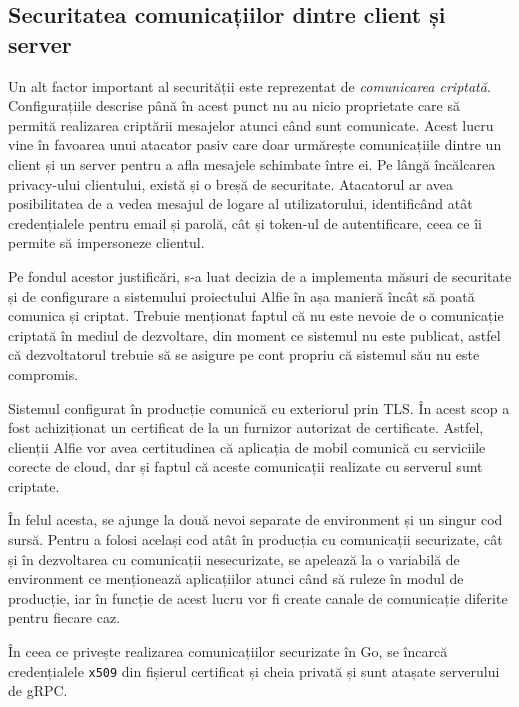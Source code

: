 \subsection{Securitatea comunicațiilor dintre client și server}

Un alt factor important al securității este reprezentat de \textit{comunicarea criptată}. Configurațiile descrise până în acest punct nu au nicio proprietate care să permită realizarea criptării mesajelor atunci când sunt comunicate. Acest lucru vine în favoarea unui atacator pasiv care doar urmărește comunicațiile dintre un client și un server pentru a afla mesajele schimbate între ei. Pe lângă încălcarea privacy-ului clientului, există și o breșă de securitate. Atacatorul ar avea posibilitatea de a vedea mesajul de logare al utilizatorului, identificând atât credențialele pentru email și parolă, cât și token-ul de autentificare, ceea ce îi permite să impersoneze clientul.

Pe fondul acestor justificări, s-a luat decizia de a implementa măsuri de securitate și de configurare a sistemului proiectului Alfie în așa manieră încât să poată comunica și criptat. Trebuie menționat faptul că nu este nevoie de o comunicație criptată în mediul de dezvoltare, din moment ce sistemul nu este publicat, astfel că dezvoltatorul trebuie să se asigure pe cont propriu că sistemul său nu este compromis.

Sistemul configurat în producție comunică cu exteriorul prin TLS. În acest scop a fost achiziționat un certificat de la un furnizor autorizat de certificate. Astfel, clienții Alfie vor avea certitudinea că aplicația de mobil comunică cu serviciile corecte de cloud, dar și faptul că aceste  comunicații realizate cu serverul sunt criptate.

În felul acesta, se ajunge la două nevoi separate de environment și un singur cod sursă. Pentru a folosi același cod atât în producția cu comunicații securizate, cât și în dezvoltarea cu comunicații nesecurizate, se apelează la o variabilă de environment ce menționează aplicațiilor atunci când să ruleze în modul de producție, iar în funcție de acest lucru vor fi create canale de comunicație diferite pentru fiecare caz.

În ceea ce privește realizarea comunicațiilor securizate în Go, se încarcă credențialele \texttt{x509} din fișierul certificat și cheia privată și sunt atașate serverului de gRPC.

\begin{code}
    \inputminted[frame=single,framesep=2mm,linenos,breaklines,tabsize=2]{go}{code/tls-grpc-go.go}
    \label{code:go_grpc_tls}
\end{code}

